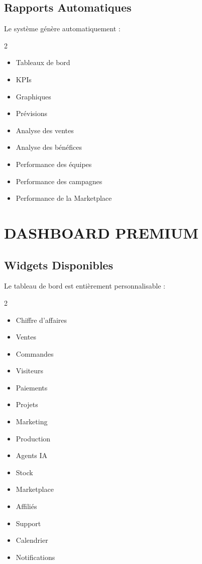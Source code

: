 \documentclass[12pt,a4paper,oneside]{book}
\begin{document}
\section{Rapports Automatiques}
Le système génère automatiquement :
\begin{multicols}{2}
\begin{itemize}
\item Tableaux de bord
\item KPIs
\item Graphiques
\item Prévisions
\item Analyse des ventes
\item Analyse des bénéfices
\item Performance des équipes
\item Performance des campagnes
\item Performance de la Marketplace
\end{itemize}
\end{multicols}

\chapter{DASHBOARD PREMIUM}

\section{Widgets Disponibles}
Le tableau de bord est entièrement personnalisable :
\begin{multicols}{2}
\begin{itemize}
\item Chiffre d'affaires
\item Ventes
\item Commandes
\item Visiteurs
\item Paiements
\item Projets
\item Marketing
\item Production
\item Agents IA
\item Stock
\item Marketplace
\item Affiliés
\item Support
\item Calendrier
\item Notifications
\end{itemize}
\end{multicols}
\end{document}
